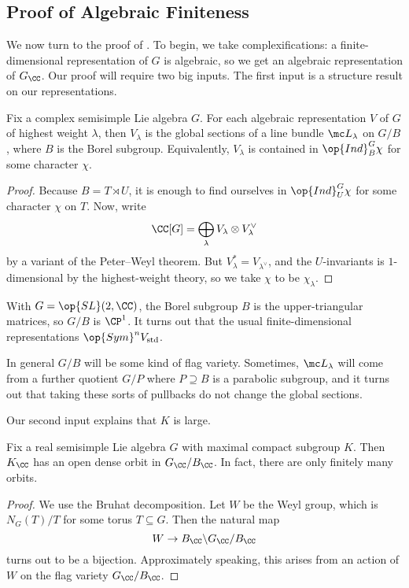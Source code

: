 \documentclass[../notes.tex]{subfiles}
\begin{document}
\subsection{Proof of Algebraic Finiteness}
We now turn to the proof of . To begin, we take complexifications: a finite-dimensional representation of $G$ is algebraic, so we get an algebraic representation of $G_\CC$. Our proof will require two big inputs. The first input is a structure result on our representations.
\begin{theorem}
	Fix a complex semisimple Lie algebra $G$. For each algebraic representation $V$ of $G$ of highest weight $\lambda$, then $V_\lambda$ is the global sections of a line bundle $\mc L_\lambda$ on $G/B$, where $B$ is the Borel subgroup. Equivalently, $V_\lambda$ is contained in $\op{Ind}_B^G\chi$ for some character $\chi$.
\end{theorem}
\begin{proof}
	Because $B=T\rtimes U$, it is enough to find ourselves in $\op{Ind}_U^G\chi$ for some character $\chi$ on $T$. Now, write
	\[\CC[G]=\bigoplus_\lambda V_\lambda\otimes V_\lambda^\lor\]
	by a variant of the Peter--Weyl theorem. But $V_\lambda^*=V_{\lambda^\lor}$, and the $U$-invariants is $1$-dimensional by the highest-weight theory, so we take $\chi$ to be $\chi_\lambda$.
\end{proof}
\begin{example}
	With $G=\op{SL}(2,\CC)$, the Borel subgroup $B$ is the upper-triangular matrices, so $G/B$ is $\CP^1$. It turns out that the usual finite-dimensional representations $\op{Sym}^nV_{\mathrm{std}}$.
\end{example}
\begin{remark}
	In general $G/B$ will be some kind of flag variety. Sometimes, $\mc L_\lambda$ will come from a further quotient $G/P$ where $P\supseteq B$ is a parabolic subgroup, and it turns out that taking these sorts of pullbacks do not change the global sections.
\end{remark}
Our second input explains that $K$ is large.
\begin{proposition}
	Fix a real semisimple Lie algebra $G$ with maximal compact subgroup $K$. Then $K_\CC$ has an open dense orbit in $G_\CC/B_\CC$. In fact, there are only finitely many orbits.
\end{proposition}
\begin{proof}
	We use the Bruhat decomposition. Let $W$ be the Weyl group, which is $N_G(T)/T$ for some torus $T\subseteq G$. Then the natural map
	\[W\to B_\CC\backslash G_\CC/B_\CC\]
	turns out to be a bijection. Approximately speaking, this arises from an action of $W$ on the flag variety $G_\CC/B_\CC$.
\end{proof}
\end{document}
